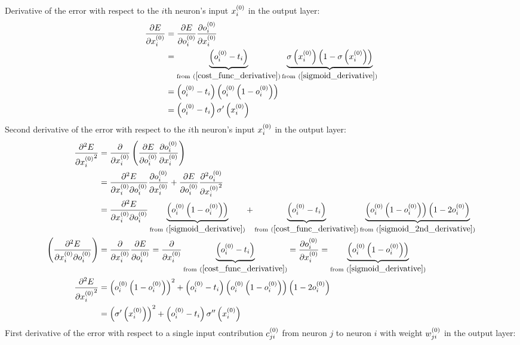 Derivative of the error with respect to the $i$th neuron's input $x_{i}^{(0)}$ in the output layer:
\begin{align}
\pdv{E}{\Input i 0} &= \pdv{E}{\Out i 0} \pdv{\Out i 0}{\Input i 0} 
\\
&= \underbrace{\left(\Out i 0 - \Target i\right)}_{\text{from} \ (\ref{cost_func_derivative})} \underbrace{\sigma\left(\Input i 0\right)\left(1 - \sigma\left(\Input i 0\right)\right)}
_{\text{from} \ (\ref{sigmoid_derivative})}
\\
&= \left(\Out i 0 - \Target i\right)\left(\Out i 0 \left(1 - \Out i 0\right)\right)
\\
&= \left(\Out i 0 - \Target i\right)\sigma^{\prime}\left(\Input i 0\right)\label{dedx}
\end{align}
Second derivative of the error with respect to the $i$th neuron's input $x_{i}^{(0)}$ in the output layer:
\begin{align}
\pdv[2]{E}{{\Input i 0}} &= \pdv{}{\Input i 0}
\left(\pdv{E}{\Out i 0}\pdv{\Out i 0}{\Input i 0}\right) 
\\
&= \pdv{E}{\Input i 0}{\Out i 0}
\pdv{\Out i 0}{\Input i 0} + \pdv{E}{\Out i 0}\pdv[2]{\Out i 0}{{\Input i 0}}
\\
&= \pdv{E}{\Input i 0}{\Out i 0}
\underbrace{\left(\Out i 0 \left(1 - \Out i 0\right)\right)}_{{\text{from} \ (\ref{sigmoid_derivative})}} + \underbrace{\left(\Out i 0 - \Target i\right)}_{\text{from} \ (\ref{cost_func_derivative})}\underbrace{\left(\Out i 0 \left(1 - \Out i 0\right)\right)\left(1 - 2\Out i 0\right) }_{\text{from}\ (\ref{sigmoid_2nd_derivative})}
\\
\left(\pdv{E}{\Input i 0}{\Out i 0}\right)
&= \pdv{}{\Input i 0}\pdv{E}{\Out i 0} = \pdv{}{\Input i 0}\underbrace{\left(\Out i 0 - \Target i\right)}_{\text{from} \ (\ref{cost_func_derivative})} = \pdv{\Out i 0}{\Input i 0} = \underbrace{\left(\Out i 0 \left(1 - \Out i 0\right)\right)}_{{\text{from} \ (\ref{sigmoid_derivative})}} 
\\
\pdv[2]{E}{{\Input i 0}}&= \left(\Out i 0 \left(1 - \Out i 0\right)\right)^2 + \left(\Out i 0 - \Target i\right)\left(\Out i 0 \left(1 - \Out i 0\right)\right)\left(1 - 2\Out i 0\right) 
\\
&= \left(\sigma^{\prime}\left(\Input i 0\right)\right)^2 + \left(\Out i 0 - \Target i\right)\sigma^{\prime\prime}\left(\Input i 0\right)\label{d2edx2}
\end{align}
First derivative of the error with respect to a single input contribution $c_{ji}^{(0)}$ from neuron $j$ to neuron $i$ with weight $w_{ji}^{(0)}$ in the output layer:
